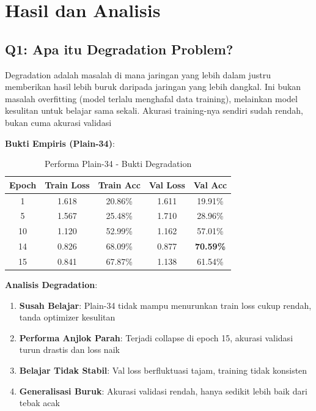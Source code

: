 \section{Hasil dan Analisis}

\subsection{Q1: Apa itu Degradation Problem?}

Degradation adalah masalah di mana jaringan yang lebih dalam justru memberikan hasil
lebih buruk daripada jaringan yang lebih dangkal. Ini bukan masalah overfitting (model terlalu menghafal
data training), melainkan model kesulitan untuk belajar sama sekali. Akurasi training-nya sendiri sudah
rendah, bukan cuma akurasi validasi

\textbf{Bukti Empiris (Plain-34)}:

\begin{table}[h]
\centering
\caption{Performa Plain-34 - Bukti Degradation}
\scriptsize
\begin{tabular}{|c|c|c|c|c|}
\hline
\textbf{Epoch} & \textbf{Train Loss} & \textbf{Train Acc} & \textbf{Val Loss} & \textbf{Val Acc} \\
\hline
1  & 1.618 & 20.86\% & 1.611 & 19.91\% \\
5  & 1.567 & 25.48\% & 1.710 & 28.96\% \\
10 & 1.120 & 52.99\% & 1.162 & 57.01\% \\
14 & 0.826 & 68.09\% & 0.877 & \textbf{70.59\%} \\
15 & 0.841 & 67.87\% & 1.138 & 61.54\% \\
\hline
\end{tabular}
\end{table}

\textbf{Analisis Degradation}:
\begin{enumerate}
    \item \textbf{Susah Belajar}: Plain-34 tidak mampu menurunkan train loss cukup rendah, tanda optimizer kesulitan

    \item \textbf{Performa Anjlok Parah}: Terjadi collapse di epoch 15, akurasi validasi turun drastis dan loss naik
    
    \item \textbf{Belajar Tidak Stabil}: Val loss berfluktuasi tajam, training tidak konsisten
    
    \item \textbf{Generalisasi Buruk}: Akurasi validasi rendah, hanya sedikit lebih baik dari tebak acak
\end{enumerate}

